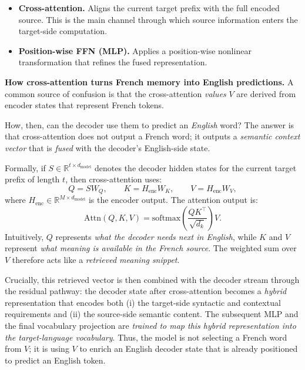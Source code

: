 \begin{enumerate}
\begin{itemize}
		\item \textbf{Cross-attention.}
		Aligns the current target prefix with the full encoded source.
		This is the main channel through which source information enters the target-side computation.
		
		\item \textbf{Position-wise FFN (MLP).}
		Applies a position-wise nonlinear transformation that refines the fused representation.
	\end{itemize}
	
	\noindent
	\textbf{How cross-attention turns French memory into English predictions.}
	A common source of confusion is that the cross-attention \emph{values} \(V\) are derived from encoder states that represent French tokens.
	
	\newpage
	
	How, then, can the decoder use them to predict an \emph{English} word?
	The answer is that cross-attention does not output a French word;
	it outputs a \emph{semantic context vector} that is \emph{fused} with the decoder’s English-side state.
	
	\noindent
	Formally, if \(S \in \mathbb{R}^{t \times d_{\text{model}}}\) denotes the decoder hidden states for the current target prefix of length \(t\), then cross-attention uses:
	\[
	Q = S W_Q,
	\qquad
	K = H_{\text{enc}} W_K,
	\qquad
	V = H_{\text{enc}} W_V,
	\]
	where \(H_{\text{enc}} \in \mathbb{R}^{M \times d_{\text{model}}}\) is the encoder output.
	The attention output is:
	\[
	\text{Attn}(Q,K,V) = \text{softmax}\!\left(\frac{QK^\top}{\sqrt{d_k}}\right)V.
	\]
	Intuitively, \(Q\) represents \emph{what the decoder needs next in English},
	while \(K\) and \(V\) represent \emph{what meaning is available in the French source}.
	The weighted sum over \(V\) therefore acts like a \emph{retrieved meaning snippet}.
	
	\noindent
	Crucially, this retrieved vector is then combined with the decoder stream through the residual pathway:
	the decoder state after cross-attention becomes a \emph{hybrid} representation that encodes both
	(i) the target-side syntactic and contextual requirements and
	(ii) the source-side semantic content.
	The subsequent MLP and the final vocabulary projection are \emph{trained to map this hybrid representation into the target-language vocabulary}.
	Thus, the model is not selecting a French word from \(V\);
	it is using \(V\) to enrich an English decoder state that is already positioned to predict an English token.
	

\end{enumerate}
